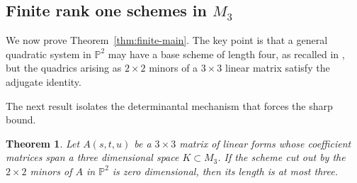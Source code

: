 \documentclass[11pt]{amsart}
\newcommand{\chg}[1]{#1}
\theoremstyle{plain}
\newtheorem{theorem}{Theorem}[section]
\theoremstyle{definition}
\theoremstyle{remark}
\begin{document}
\subsection{Finite \chg{rank one} schemes in \texorpdfstring{$M_3$}{M3}}\label{subsec:finite}

We now prove Theorem~\ref{thm:finite-main}. The key point is that a general quadratic system in $\mathbb P^2$ may have a base scheme of length four, as recalled in \cite[Lemma~4.1]{GesmundoKeneshlou2026}, but the quadrics arising as $2\times2$ minors of a $3\times3$ linear matrix satisfy the adjugate identity.

\chg{The next result isolates the determinantal mechanism that forces the sharp bound.}

\begin{theorem}\label{thm:length-bound}
Let $A(s,t,u)$ be a $3\times3$ matrix of linear forms whose coefficient matrices span a \chg{three dimensional} space $K\subset M_3$. If the scheme cut out by the $2\times2$ minors of $A$ in $\mathbb P^2$ is \chg{zero dimensional}, then its length is at most three.
\end{theorem}
\end{document}
